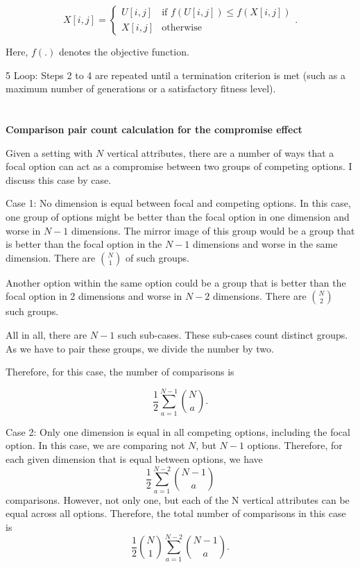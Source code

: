 \documentclass[a4paper,12pt]{article}
\begin{document}
        $$
        X[i, j] =
        \begin{cases}
            U[i, j] & \text{if } f(U[i, j]) \leq f(X[i, j]) \\
            X[i, j] & \text{otherwise}
        \end{cases} .
        $$

Here, $f(.)$ denotes the objective function.

5 Loop: Steps 2 to 4 are repeated until a termination criterion is met (such as a maximum number of generations or a satisfactory fitness level).



\clearpage
\section{}\label{appendix:compromiseCalculation}

\textbf{Comparison pair count calculation for the compromise effect}

Given a setting with $N$ vertical attributes, there are a number of ways that a focal option can act as a compromise between two groups of competing options.
I discuss this case by case.

Case 1: No dimension is equal between focal and competing options. In this case, one group of options might be better than the focal option in one dimension and worse in $N-1$ dimensions. The mirror image of this group would be a group that is better than the focal option in the $N-1$ dimensions and worse in the same dimension. There are $\binom{N}{1}$ of such groups.

Another option within the same option could be a group that is better than the focal option in 2 dimensions and worse in $N-2$ dimensions. There are $\binom{N}{2}$ such groups. 

All in all, there are $N-1$ such sub-cases. These sub-cases count distinct groups. As we have to pair these groups, we divide the number by two.

Therefore, for this case, the number of comparisons is 

$$\frac{1}{2}\sum_{a=1}^{N-1}\binom{N}{a}.$$

Case 2: Only one dimension is equal in all competing options, including the focal option. In this case, we are comparing not $N$, but $N-1$ options. Therefore, for each given dimension that is equal between options, we have $$\frac{1}{2}\sum_{a=1}^{N-2}\binom{N-1}{a}$$ comparisons. However, not only one, but each of the N vertical attributes can be equal across all options. Therefore, the total number of comparisons in this case is $$\frac{1}{2}\binom{N}{1}\sum_{a=1}^{N-2}{\binom{N-1}{a}.}$$
\end{document}

